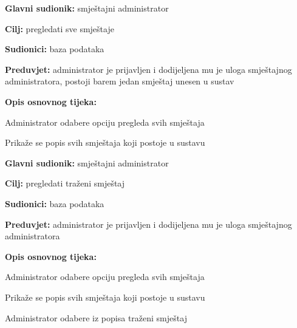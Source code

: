                         \noindent {}
					\begin{packed_item}
	
						\item \textbf{Glavni sudionik: }smještajni administrator
						\item  \textbf{Cilj:} pregledati sve smještaje
						\item  \textbf{Sudionici:} baza podataka
						\item  \textbf{Preduvjet:} administrator je prijavljen i dodijeljena mu je uloga smještajnog administratora, postoji barem jedan smještaj unesen u sustav
						\item  \textbf{Opis osnovnog tijeka:}
						
						\item[] \begin{packed_enum}
	
							\item Administrator odabere opciju pregleda svih smještaja
							\item Prikaže se popis svih smještaja koji postoje u sustavu
							
						\end{packed_enum}
						
					\end{packed_item}

                        \noindent {}
					\begin{packed_item}
	
						\item \textbf{Glavni sudionik: }smještajni administrator
						\item  \textbf{Cilj:} pregledati traženi smještaj
						\item  \textbf{Sudionici:} baza podataka
						\item  \textbf{Preduvjet:} administrator je prijavljen i dodijeljena mu je uloga smještajnog administratora
						\item  \textbf{Opis osnovnog tijeka:}
						
						\item[] \begin{packed_enum}
	
							\item Administrator odabere opciju pregleda svih smještaja
							\item Prikaže se popis svih smještaja koji postoje u sustavu
							\item Administrator odabere iz popisa traženi smještaj
						
						\end{packed_enum}
						
					\end{packed_item}

